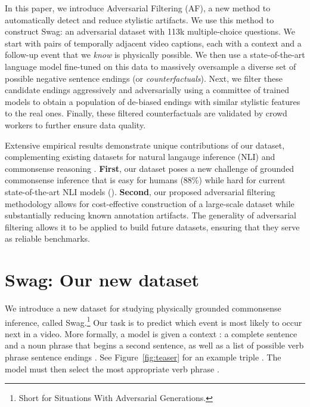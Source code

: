 \documentclass[11pt,a4paper]{article}
\newcommand\customfont[1]{{\usefont{T1}{perm}{m}{n}#1}}
\newcommand{\datasetname}{{\small\customfont{Swag}}}
\newcommand{\datasetnamelong}{{\small\customfont{S}}ituations {\small\customfont{W}}ith {\small\customfont{A}}dversarial {\small\customfont{G}}enerations}
\begin{document}
In this paper, we introduce 
Adversarial Filtering (AF), 
a new method to automatically detect and reduce stylistic artifacts.
We use this method to construct 
\datasetname:
an adversarial dataset with 113k multiple-choice questions. 
We start with pairs of temporally adjacent video captions, each with a context and a follow-up event that we \emph{know} is physically possible. 
We then use a state-of-the-art language model fine-tuned on this data to massively oversample a diverse set of possible negative sentence endings (or \emph{counterfactuals}). Next, we filter these candidate endings aggressively and adversarially using a committee of trained models to obtain a population of de-biased endings with similar stylistic features to the real ones.
Finally, these filtered counterfactuals are validated by crowd workers to further ensure data quality.

Extensive empirical results demonstrate unique contributions of our dataset, complementing existing datasets for natural langauge inference (NLI) \cite{bowman2015snli, williams17multisnli} and commonsense reasoning \cite{roemmele_choice_2011,mostafazadeh_corpus_2016,zhang_ordinal_2017}.
\textbf{First}, our dataset poses a new challenge of grounded commonsense inference that is easy for humans (88\%) while hard for current state-of-the-art NLI models (). 
\textbf{Second}, our proposed adversarial filtering methodology allows for cost-effective construction of a large-scale dataset while substantially reducing known annotation artifacts. 
The generality of adversarial filtering allows it to be applied to build future datasets, ensuring that they serve as reliable benchmarks.



























 
\section{\datasetname: Our new dataset}
\label{sec:overview}

We introduce a new dataset for studying physically grounded commonsense inference, called \datasetname.\footnote{Short for \datasetnamelong.} Our task is to predict which event is most likely to occur next in a video. More formally, a model is given a context : a complete sentence  and a noun phrase  that begins a second sentence, as well as a list of possible verb phrase sentence endings . See Figure~\ref{fig:teaser} for an example triple . The model must then select the most appropriate verb phrase .
\end{document}
